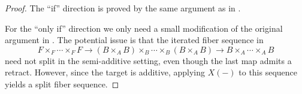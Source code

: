 \documentclass[a4paper,10pt, oneside]{amsart}
\begin{document}
	\begin{proof}
		The ``if'' direction is proved by the same argument as in \cite[Theorem 2.8]{pstrkagowski2023synthetic}.
		
		For the ``only if'' direction we only need a small modification of the original argument in \cite[Theorem 2.8]{pstrkagowski2023synthetic}. The potential issue is that the iterated fiber sequence in \mcc
		\[
		F\times_F\cdots\times_F F \longrightarrow (B\times_A B)\times_B\cdots\times_B(B\times_A B)\longrightarrow B\times_A\cdots\times_A B
		\]
		need not split in the semi-additive setting, even though the last map admits a retract. However, since the target \infcat \mce is additive, applying $X(-)$ to this sequence yields a split fiber sequence. %
	\end{proof}
\end{document}
